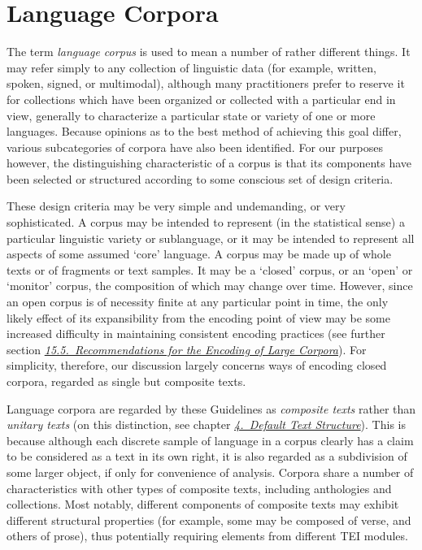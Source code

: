 
\section[{Language Corpora}]{Language Corpora}\label{CC}\par
The term \textit{language corpus} is used to mean a number of rather different things. It may refer simply to any collection of linguistic data (for example, written, spoken, signed, or multimodal), although many practitioners prefer to reserve it for collections which have been organized or collected with a particular end in view, generally to characterize a particular state or variety of one or more languages. Because opinions as to the best method of achieving this goal differ, various subcategories of corpora have also been identified. For our purposes however, the distinguishing characteristic of a corpus is that its components have been selected or structured according to some conscious set of design criteria.\par
These design criteria may be very simple and undemanding, or very sophisticated. A corpus may be intended to represent (in the statistical sense) a particular linguistic variety or sublanguage, or it may be intended to represent all aspects of some assumed ‘core’ language. A corpus may be made up of whole texts or of fragments or text samples. It may be a ‘closed’ corpus, or an ‘open’ or ‘monitor’ corpus, the composition of which may change over time. However, since an open corpus is of necessity finite at any particular point in time, the only likely effect of its expansibility from the encoding point of view may be some increased difficulty in maintaining consistent encoding practices (see further section \textit{\hyperref[CCREC]{15.5.\ Recommendations for the Encoding of Large Corpora}}). For simplicity, therefore, our discussion largely concerns ways of encoding closed corpora, regarded as single but composite texts.\par
Language corpora are regarded by these Guidelines as \textit{composite texts} rather than \textit{unitary texts} (on this distinction, see chapter \textit{\hyperref[DS]{4.\ Default Text Structure}}). This is because although each discrete sample of language in a corpus clearly has a claim to be considered as a text in its own right, it is also regarded as a subdivision of some larger object, if only for convenience of analysis. Corpora share a number of characteristics with other types of composite texts, including anthologies and collections. Most notably, different components of composite texts may exhibit different structural properties (for example, some may be composed of verse, and others of prose), thus potentially requiring elements from different TEI modules.\par
